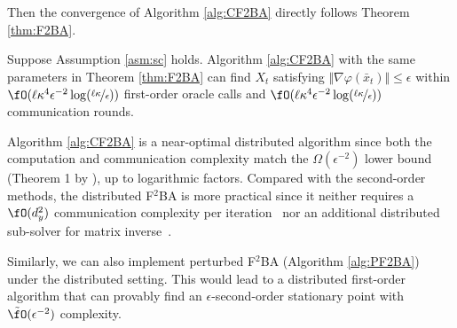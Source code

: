 \documentclass{article}
\begin{document}
Then the convergence of Algorithm \ref{alg:CF2BA} directly follows Theorem \ref{thm:F2BA}.
\begin{cor} \label{cor:CF2BA}
Suppose Assumption \ref{asm:sc} holds.
Algorithm \ref{alg:CF2BA} with the same parameters in Theorem \ref{thm:F2BA} can find  $X_t$ satisfying $ \Vert \nabla \varphi(\bar x_t) \Vert \le \epsilon $ within $\fO(\ell \kappa^4 \epsilon^{-2} \log(\nicefrac{\ell \kappa}{\epsilon})) $ first-order oracle calls and  $\fO( \ell \kappa^4 \epsilon^{-2} \log(\nicefrac{\ell \kappa}{\epsilon})) $ communication rounds.
\end{cor}

Algorithm \ref{alg:CF2BA} is a near-optimal distributed algorithm since both the computation and communication complexity match the $\Omega(\epsilon^{-2})$ lower bound (Theorem 1 by \citet{lu2021optimal}), up to logarithmic factors.
Compared with the second-order methods, the distributed F${}^2$BA is more
practical since it
neither requires a $\fO(d_y^2)$ communication complexity per iteration~\citep{yangdecentralized} nor an additional distributed sub-solver for matrix inverse~\citep{tarzanagh2022fednest,chen2022decentralized}. 

\begin{rmk}
Similarly, we can also implement perturbed {F${}^2$BA} (Algorithm \ref{alg:PF2BA}) under the distributed setting. This would lead to a distributed first-order algorithm that can provably find an $\epsilon$-second-order stationary point with $\tilde \fO(\epsilon^{-2})$ complexity.
\end{rmk}
\end{document}
